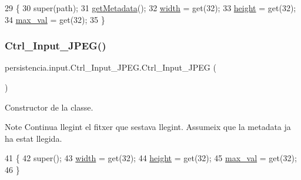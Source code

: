 \begin{DoxyCode}
29                                         \{
30         super(path);
31         \hyperlink{classpersistencia_1_1input_1_1Ctrl__Input_a46e05fce164a6803820c02565c1769c8}{getMetadata}();
32         \hyperlink{classpersistencia_1_1input_1_1Ctrl__Input__JPEG_a07d902b25b54941dc0444398c7d380e7}{width} = \textcolor{keyword}{get}(32);
33         \hyperlink{classpersistencia_1_1input_1_1Ctrl__Input__JPEG_a9e6805b998e58981f8cd7b8b6e609f27}{height} = \textcolor{keyword}{get}(32);
34         \hyperlink{classpersistencia_1_1input_1_1Ctrl__Input__JPEG_a8720235be6a11ef90085217064bbb1b0}{max\_val} = \textcolor{keyword}{get}(32);
35     \}
\end{DoxyCode}
\mbox{\label{classpersistencia_1_1input_1_1Ctrl__Input__JPEG_a5c340483ee0fc78f985bd5d2ddcbb3a0}} 
\subsubsection{\texorpdfstring{Ctrl\+\_\+\+Input\+\_\+\+J\+P\+E\+G()}{Ctrl\_Input\_JPEG()}\hspace{0.1cm}{\footnotesize\ttfamily [2/2]}}
{\footnotesize\ttfamily persistencia.\+input.\+Ctrl\+\_\+\+Input\+\_\+\+J\+P\+E\+G.\+Ctrl\+\_\+\+Input\+\_\+\+J\+P\+EG (\begin{DoxyParamCaption}{ }\end{DoxyParamCaption})\hspace{0.3cm}{\ttfamily [inline]}}



Constructor de la classe. 

\begin{DoxyNote}{Note}
Continua llegint el fitxer que s\textquotesingle{}estava llegint. Assumeix que la metadata ja ha estat llegida. 
\end{DoxyNote}

\begin{DoxyCode}
41                              \{
42         super();
43         \hyperlink{classpersistencia_1_1input_1_1Ctrl__Input__JPEG_a07d902b25b54941dc0444398c7d380e7}{width} = \textcolor{keyword}{get}(32);
44         \hyperlink{classpersistencia_1_1input_1_1Ctrl__Input__JPEG_a9e6805b998e58981f8cd7b8b6e609f27}{height} = \textcolor{keyword}{get}(32);
45         \hyperlink{classpersistencia_1_1input_1_1Ctrl__Input__JPEG_a8720235be6a11ef90085217064bbb1b0}{max\_val} = \textcolor{keyword}{get}(32);
46     \}
\end{DoxyCode}


